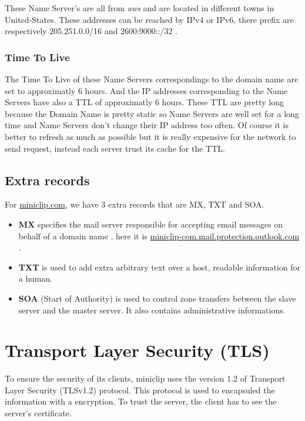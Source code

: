 \documentclass{article}
\begin{document}
These Name Server's are all from \textit{aws} and are located in different towns in United-States. These addresses can be reached by IPv4 or IPv6, there prefix are respectively 205.251.0.0/16 and 2600:9000::/32 .

\subsubsection{Time To Live}
\label{subsub:nsttl}

The Time To Live of these Name Servers correspondings to the domain name are set to approximatly 6 hours. And the IP addresses corresponding to the Name Servers have also a TTL of approximatly 6 hours. These TTL are pretty long because the Domain Name is pretty static so Name Servers are well set for a long time and Name Servers don't change their IP address too often. Of course it is better to refresh as much as possible but it is really expensive for the network to send request, instead each server trust its cache for the TTL.

\subsection{Extra records}
\label{subsub:extra}

For \url{miniclip.com}, we have 3 extra records that are MX, TXT and SOA.
\begin{itemize}
    \itemsep-0.1em
    \item \textbf{MX} specifies the mail server responsible for accepting email messages on behalf of a domain name \cite{mx}, here it is \url{miniclip-com.mail.protection.outlook.com} . 
    \item \textbf{TXT} is used to add extra arbitrary text over a host, readable information for a human.
    \item \textbf{SOA} (Start of Authority) is used to control zone transfers between the slave server and the master server. It also contains administrative informations.
\end{itemize}



\section{Transport Layer Security (TLS)}
\label{sec:TCP}

To ensure the security of its clients, miniclip uses the version 1.2 of Transport Layer Security (TLSv1.2) protocol. This protocol is used to encapsuled the information with a encryption. To trust the server, the client has to see the server's certificate.
\end{document}
